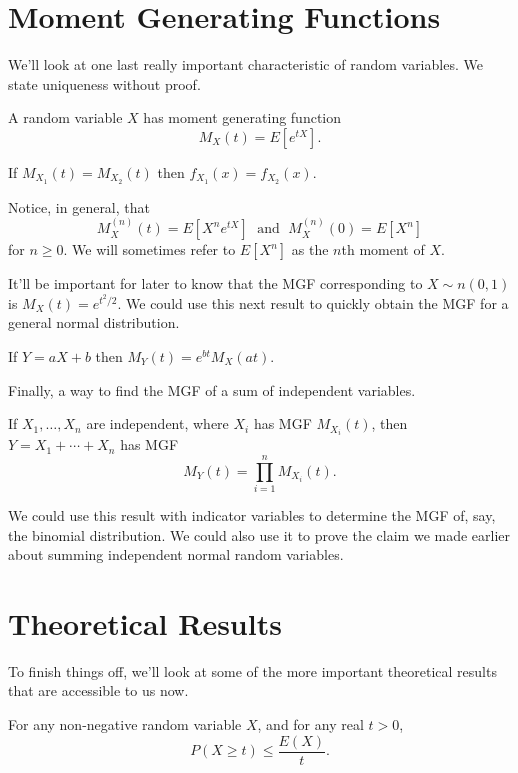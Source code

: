 \documentclass[../m157main.tex]{subfiles}
\begin{document}
\section{Moment Generating Functions}
We'll look at one last really important characteristic of random variables.
We state uniqueness without proof.

\begin{definition}
    A random variable $X$ has moment generating function
    \[ M_X(t) = E [e^{tX}]. \]
\end{definition}

\begin{theorem}
    If $M_{X_1}(t) = M_{X_2}(t)$ then $f_{X_1}(x) = f_{X_2}(x)$.
\end{theorem}

Notice, in general, that
\[ M_X^{(n)}(t) = E[X^{n} e^{tX}] \;\text{ and }\; M_X^{(n)}(0) = E[X^{n}] \]
for $n \geq 0$.
We will sometimes refer to $E[X^n]$ as the $n$th moment of $X$.

It'll be important for later to know that the MGF corresponding to $X \sim n(0,1)$ is $M_X(t) = e^{t^2 / 2}$.
We could use this next result to quickly obtain the MGF for a general normal distribution.

\begin{theorem}[]
    If $Y = aX + b$ then $M_Y(t) = e^{bt} M_X(at)$.
\end{theorem}

Finally, a way to find the MGF of a sum of independent variables.

\begin{theorem}
    If $X_1, \ldots, X_n$ are independent, where $X_i$ has MGF $M_{X_i}(t)$, then $Y = X_1 + \cdots + X_n$ has MGF
    \[ M_Y(t) = \prod_{i=1}^{n} M_{X_i}(t). \]
\end{theorem}

We could use this result with indicator variables to determine the MGF of, say, the binomial distribution.
We could also use it to prove the claim we made earlier about summing independent normal random variables.

\section{Theoretical Results}
To finish things off, we'll look at some of the more important theoretical results that are accessible to us now.

\begin{theorem}
    For any non-negative random variable $X$, and for any real $t > 0$,
    \[ P(X \geq t) \leq \frac{E(X)}{t}. \]
\end{theorem}
\end{document}

